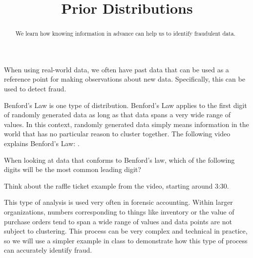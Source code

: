 \documentclass{ximera}
\title{Prior Distributions}
\begin{document}
\begin{abstract}
We learn how knowing information in advance can help us to identify fraudulent data.
\end{abstract}
\maketitle

When using real-world data, we often have past data that can be used as a reference point for making observations about new data. Specifically, this can be used to detect fraud.

Benford's Law is one type of distribution. Benford's Law applies to the first digit of randomly generated data as long as that data spans a very wide range of values. In this context, randomly generated data simply means information in the world that has no particular reason to cluster together. The following video explains Benford's Law: .

\begin{question}
When looking at data that conforms to Benford's law, which of the following digits will be the most common leading digit?

    \begin{multipleChoice}
    \end{multipleChoice}
    \begin{hint}
      Think about the raffle ticket example from the video, starting around 3:30.
    \end{hint}

\end{question}

This type of analysis is used very often in forensic accounting. Within larger organizations, numbers corresponding to things like inventory or the value of purchase orders tend to span a wide range of values and data points are not subject to clustering. This process can be very complex and technical in practice, so we will use a simpler example in class to demonstrate how this type of process can accurately identify fraud.
\end{document}

